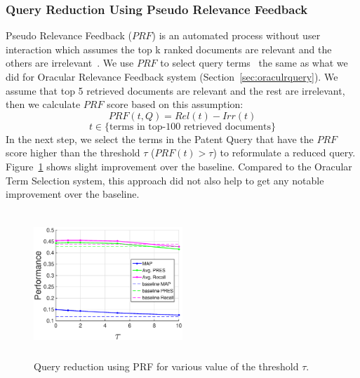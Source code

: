 \subsubsection{Query Reduction Using Pseudo Relevance Feedback}
Pseudo Relevance Feedback ($\mathit{PRF}$) is an automated process without user interaction which assumes the top k ranked documents are relevant and the others are irrelevant~\citep{Baeza-Yates2011}. We use $\mathit{PRF}$ to select query terms~\cite{maxwell2013compact} the same as what we did for Oracular Relevance Feedback system (Section~\ref{sec:oraculrquery}). We assume that top 5 retrieved documents are relevant and the rest are irrelevant, then we calculate $\mathit{PRF}$ score based on this assumption:  
\begin{equation}
PRF(t,Q)=Rel(t)-Irr(t) 
 \label{eq:score}
\end{equation}
\vspace*{-2ex}
\begin{displaymath}t\in \lbrace \mbox{terms in top-100 retrieved documents}\rbrace\end{displaymath}
In the next step, we select the terms in the Patent Query that have the  $\mathit{PRF}$ score higher than the threshold $\tau$ ($PRF(t)>\tau$) to reformulate a reduced query. Figure~\ref{fig:prf} shows slight improvement over the baseline. Compared to the Oracular Term Selection system, this approach did not also help to get any notable improvement over the baseline.
\begin{figure}[t!]
   \centering
   \includegraphics[width=0.50\textwidth,height=55mm]{figs/prf.eps}
   \caption{Query reduction using PRF for various value of the threshold $\tau$.}   
   \label{fig:prf} 
\end{figure}
